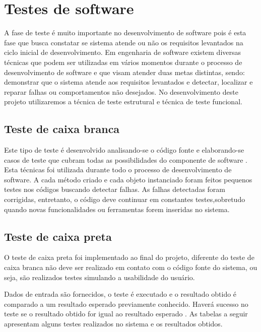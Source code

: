 \section{Testes de software}  

A fase de teste é muito importante no desenvolvimento de software pois é esta fase que busca constatar se sistema atende ou não os requisitos levantados na ciclo inicial de desenvolvimento.
Em engenharia de software existem diversas técnicas que podem ser utilizadas em vários momentos durante o processo de desenvolvimento de software e que visam atender duas metas distintas, sendo: demonstrar que o sistema atende aos requisitos levantados e detectar, localizar e reparar falhas ou comportamentos não desejados. No desenvolvimento deste projeto utilizaremos a técnica de teste estrutural e técnica de teste funcional. 

\subsection{Teste de caixa branca}

Este tipo de teste é desenvolvido analisando-se o código fonte e elaborando-se casos de teste que cubram todas as possibilidades
do componente de software \cite{neto2007introduccao}.
Esta técnicas foi utilizada durante todo o processo de desenvolvimento de software. A cada método criado e cada objeto instanciado foram feitos pequenos testes nos códigos buscando detectar falhas. As falhas detectadas foram corrigidas, entretanto, o código deve continuar em constantes testes,sobretudo quando novas funcionalidades ou ferramentas forem inseridas no sistema. 
      

\subsection{Teste de caixa preta}
O teste de caixa preta foi implementado ao final do projeto, diferente do teste de caixa branca não deve ser realizado em contato com o código fonte do sistema, ou seja, são realizados testes simulando a usabilidade do usuário. 

 Dados de entrada são fornecidos, o teste é executado e o resultado obtido é comparado a um resultado esperado previamente conhecido.
Haverá sucesso no teste se o resultado obtido for igual ao resultado esperado \cite{neto2007introduccao}.
    As tabelas a seguir apresentam alguns testes realizados no sistema e os resultados obtidos.

